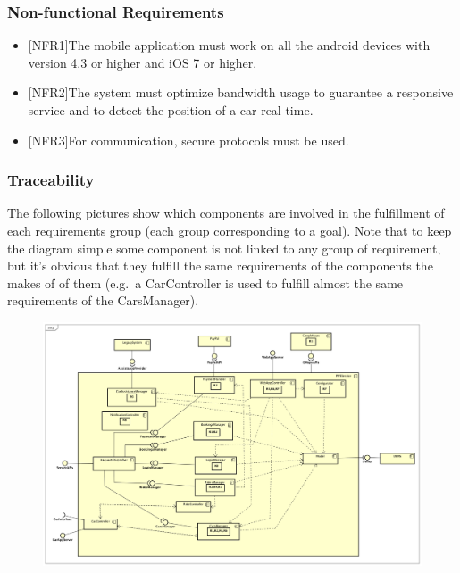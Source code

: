 \documentclass[]{article}
\providecommand{\tightlist}{%
  \setlength{\itemsep}{0pt}\setlength{\parskip}{0pt}}
\begin{document}
\subsubsection{Non-functional
Requirements}\label{non-functional-requirements}

\begin{itemize}
\tightlist
\item
  {[}NFR1{]}The mobile application must work on all the android devices
  with version 4.3 or higher and iOS 7 or higher.
\item
  {[}NFR2{]}The system must optimize bandwidth usage to guarantee a
  responsive service and to detect the position of a car real time.
\item
  {[}NFR3{]}For communication, secure protocols must be used.
\end{itemize}

\subsubsection{Traceability}\label{traceability}

The following pictures show which components are involved in the
fulfillment of each requirements group (each group corresponding to a
goal). Note that to keep the diagram simple some component is not linked
to any group of requirement, but it's obvious that they fulfill the same
requirements of the components the makes of of them (e.g.~a
CarController is used to fulfill almost the same requirements of the
CarsManager).

\begin{figure}[htbp]
\centering
\includegraphics[width=1.00000\textwidth,height=1.00000\textwidth]{./comp_diagrams/system_reqt.png}
\caption{}\label{id}
\end{figure}
\end{document}
